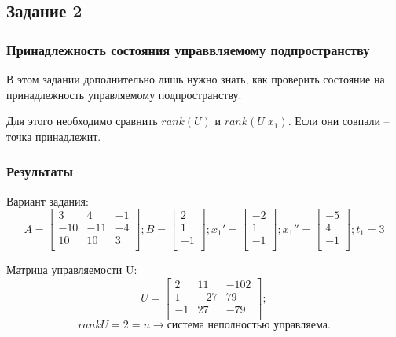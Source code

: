 \subsection{Задание 2}
\subsubsection{Принадлежность состояния управвляемому подпространству}
В этом задании дополнительно лишь нужно знать, как проверить состояние на принадлежность управляемому подпространству.

Для этого необходимо сравнить \(rank(U)\) и \(rank(U | x_1)\). Если они совпали -- точка принадлежит.


\subsubsection{Результаты}
Вариант задания:
\[ A = \begin{bmatrix}
        3 & 4 & -1 \\
        -10 & -11 & -4 \\
        10 & 10 & 3 \\
        \end{bmatrix}; 
        B = \begin{bmatrix}
                2 \\
                1 \\
                -1 \\
                \end{bmatrix}; 
        x_1' = \begin{bmatrix}
                -2 \\
                1 \\
                -1 \\
                \end{bmatrix}; 
        x_1'' = \begin{bmatrix}
                -5 \\
                4 \\
                -1 \\
                \end{bmatrix}; 
        t_1 = 3
\]

Матрица управляемости U:
\[ U = \begin{bmatrix}
        2 & 11 & -102 \\
        1 & -27 & 79 \\
        -1 & 27 & -79 \\
        \end{bmatrix};
\]
\[rankU = 2 = n \rightarrow \text{система  неполностью управляема.}\]

